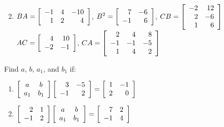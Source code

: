 \begin{multicols}{2}
\begin{ex}
\begin{enumerate}[label={\alph*.}]
\end{enumerate}
\begin{sol}
\begin{enumerate}[label={\alph*.}]
\setcounter{enumi}{1}
\item
$
BA = \left[ \begin{array}{rrr}
-1 & 4 & -10 \\
1 & 2 & 4
\end{array} \right]$, $B^{2} = \left[ \begin{array}{rr}
7 & -6 \\
-1 & 6
\end{array} \right]$, $CB = \left[ \begin{array}{rr}
-2 & 12 \\
2 & -6 \\
1 & 6
\end{array} \right]$ \\
$AC = \left[ \begin{array}{rr}
4 & 10 \\
-2 & -1
\end{array} \right]$, $CA = \left[ \begin{array}{rrr}
2 & 4 & 8 \\
-1 & -1 & -5 \\
1 & 4 & 2
\end{array} \right]
$

\end{enumerate}
\end{sol}
\end{ex}

\columnbreak
\begin{ex}
Find $a$, $b$, $a_{1}$, and $b_{1}$ if:


\begin{enumerate}[label={\alph*.}]
\item
$\left[ \begin{array}{cc}
a & b \\
a_{1} & b_{1}
\end{array} \right] \left[ \begin{array}{rr}
3 & -5 \\
-1 & 2
\end{array} \right] = \left[ \begin{array}{rr}
1 & -1 \\
2 & 0
\end{array} \right]
$

\item 
$\left[ \begin{array}{rr}
2 & 1 \\
-1 & 2
\end{array} \right] \left[ \begin{array}{cc}
a & b \\
a_{1} & b_{1}
\end{array} \right] = \left[ \begin{array}{rr}
7 & 2 \\
-1 & 4
\end{array} \right]
$


\end{enumerate}
\end{ex}
\end{multicols}
